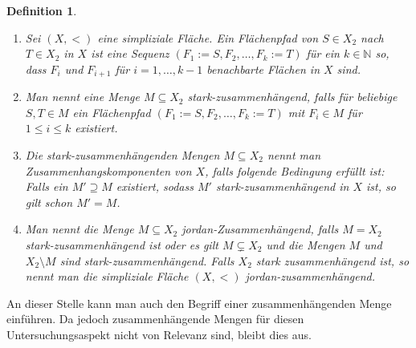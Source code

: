\documentclass[12pt,titlepage]{article}
\newtheorem{definition}{Definition}[section]
\begin{document}
\begin{definition} 

\begin{enumerate}$\textcolor{blue}{(neu)}$
\item Sei $(X,<)$ eine simpliziale Fläche. Ein \emph{Flächenpfad} von $S\in X_{2}$ nach $T \in X_{2}$ in $X$ ist eine Sequenz $(F_1:=S,F_{2},\ldots,F_{k}:=T)$ für ein $k \in \mathbb{N}$ so, dass $F_{i} $ und $F_{i+1}$ für $i=1,\ldots,k-1$ benachbarte Flächen in $X$ sind.
\item Man nennt eine Menge $M\subseteq X_2$  \emph{stark-zusammenhängend}, falls für beliebige $S,T \in M$ ein Flächenpfad $(F_{1}:=S,F_{2},\ldots,F_{k}:=T)$ mit $F_i \in M$ für $1\leq i \leq k$ existiert. 
 \item Die stark-zusammenhängenden Mengen $M\subseteq X_2$ nennt man \emph{Zusammenhangskomponenten von $X$}, falls folgende Bedingung erfüllt ist: Falls ein $M'\supseteq M$ existiert, sodass $M'$ stark-zusammenhängend in $X$ ist, so gilt schon $M'=M$.
 \item Man nennt die Menge $M \subseteq X_2$ \emph{jordan-Zusammenhängend}, falls $M=X_2$ stark-zusammenhängend ist oder es gilt $M \subsetneq X_2$ und die Mengen $M$ und $X_2\setminus M$ sind stark-zusammenhängend. Falls $X_2$ stark zusammenhängend ist, so nennt man die simpliziale Fläche $(X,<)$ jordan-zusammenhängend.
\end {enumerate}
\end{definition}
An dieser Stelle kann man auch den Begriff einer zusammenhängenden Menge einführen. Da jedoch zusammenhängende Mengen für diesen Untersuchungsaspekt nicht von Relevanz sind, bleibt dies aus.
\end{document}
